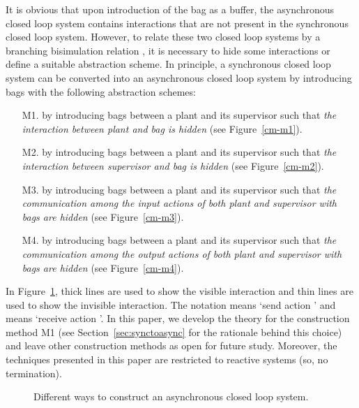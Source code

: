 \documentclass[copyright]{eptcs}
\theoremstyle{plain}
\theoremstyle{definition}
\begin{document}
It is obvious that upon introduction of the bag as a buffer, the asynchronous closed loop system contains interactions that are not present in the synchronous closed loop system. However, to relate these two closed loop systems by a branching bisimulation relation \citep{Glabeek90}, it is necessary to hide some interactions or define a suitable abstraction scheme. In principle, a synchronous closed loop system can be converted into an asynchronous closed loop system by introducing bags with the following abstraction schemes:
\begin{itemize}
\item[M1.] by introducing bags between a plant and its supervisor such that \textit{the interaction between plant and bag is hidden} (see Figure~\ref{cm-m1}).
\item[M2.] by introducing bags between a plant and its supervisor such that \textit{the interaction between supervisor and bag is hidden} (see Figure~\ref{cm-m2}).
\item[M3.] by introducing bags between a plant and its supervisor such that \textit{the communication among the input actions of both plant and supervisor with bags are hidden} (see Figure~\ref{cm-m3}).
\item[M4.] by introducing bags between a plant and its supervisor such that \textit{the communication among the output actions of both plant and supervisor with bags are hidden} (see Figure~\ref{cm-m4}).
\end{itemize}
In Figure~\ref{cm}, thick lines are used to show the visible interaction and thin lines are used to show the invisible interaction. The notation  means `send action ' and  means `receive action '. In this paper, we develop the theory for the construction method M1 (see Section~\ref{sec:synctoasync} for the rationale behind this choice) and leave other construction methods as open for future study. Moreover, the techniques presented in this paper are restricted to reactive systems (so, no termination).

\begin{figure}\centering
{}
\hspace{1cm}  
\hspace{1cm} 
\hspace{1cm} 
\caption{Different ways to construct an asynchronous closed loop system.}\label{cm}
\end{figure}
\end{document}
